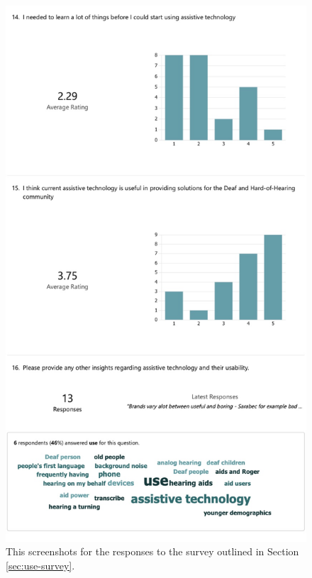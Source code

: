 \documentclass{l4proj}
\begin{document}
\begin{appendices}
\begin{figure}[H]
    \centering
    \includegraphics[width=0.75\linewidth]{dissertation/images/use-survey-5.jpeg}    
    \caption{This screenshots for the responses to the survey outlined in Section \ref{sec:use-survey}.}
    \label{fig:use-survey-5} 
\end{figure}


\end{appendices}
\end{document}
